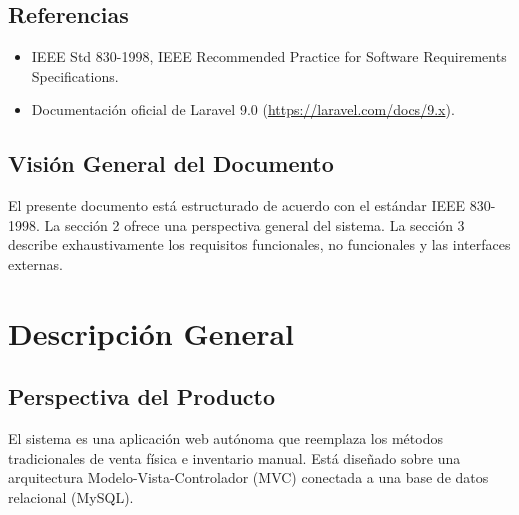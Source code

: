\documentclass[12pt, a4paper]{article}
\begin{document}
\subsection{Referencias}
\begin{itemize}
    \item IEEE Std 830-1998, IEEE Recommended Practice for Software Requirements Specifications.
    \item Documentación oficial de Laravel 9.0 (\url{https://laravel.com/docs/9.x}).
\end{itemize}

\subsection{Visión General del Documento}
El presente documento está estructurado de acuerdo con el estándar IEEE 830-1998. La sección 2 ofrece una perspectiva general del sistema. La sección 3 describe exhaustivamente los requisitos funcionales, no funcionales y las interfaces externas.

\section{Descripción General}

\subsection{Perspectiva del Producto}
El sistema es una aplicación web autónoma que reemplaza los métodos tradicionales de venta física e inventario manual. Está diseñado sobre una arquitectura Modelo-Vista-Controlador (MVC) conectada a una base de datos relacional (MySQL).
\end{document}
